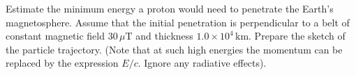 Estimate the minimum energy a proton would need to penetrate the Earth's
magnetosphere. Assume that the initial penetration is perpendicular to a belt
of constant magnetic field $30\,\mu\mathrm{T}$ and thickness
$1.0 \times 10^{4}$\,km. Prepare the sketch of the particle trajectory. (Note
that at such high energies the momentum can be replaced by the expression
$E/c$. Ignore any radiative effects).
